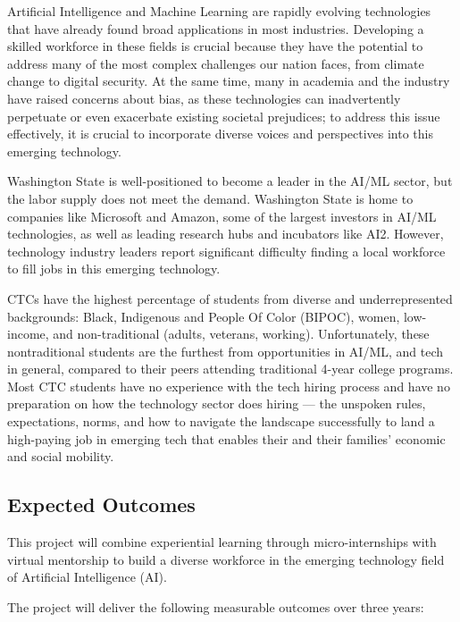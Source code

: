 Artificial Intelligence and Machine Learning are rapidly evolving technologies that have already found broad applications in most industries. Developing a skilled workforce in these fields is crucial because they have the potential to address many of the most complex challenges our nation faces, from climate change to digital security. At the same time, many in academia and the industry have raised concerns about bias, as these technologies can inadvertently perpetuate or even exacerbate existing societal prejudices; to address this issue effectively, it is crucial to incorporate diverse voices and perspectives into this emerging technology.

Washington State is well-positioned to become a leader in the AI/ML sector, but the labor supply does not meet the demand. Washington State is home to companies like Microsoft and Amazon, some of the largest investors in AI/ML technologies, as well as leading research hubs and incubators like AI2. However, technology industry leaders report significant difficulty finding a local workforce to fill jobs in this emerging technology. \cite{soper_is_2023}

CTCs have the highest percentage of students from diverse and underrepresented  backgrounds: Black, Indigenous and People Of Color (BIPOC), women, low-income, and non-traditional (adults, veterans, working).\cite{AlmanacAmericanEducation,phillippeNationalProfileCommunity2005} Unfortunately, these nontraditional students are the furthest from opportunities in AI/ML, and tech in general,\cite{singerLowerIncomeStudentsBig2023,saldanhaBlackWorkersWomen2023} compared to their peers attending traditional 4-year college programs.\cite{lohrEngineUpwardMobility2022} Most CTC students have no experience with the tech hiring process and have no preparation on how the technology sector does hiring --- the unspoken rules, expectations, norms, and how to navigate the landscape successfully to land a high-paying job in emerging tech that enables their and their families’ economic and social mobility.

\subsection{Expected Outcomes}

This project will combine experiential learning through micro-internships with virtual mentorship to build a diverse workforce in the emerging technology field of Artificial Intelligence (AI). 

The project will deliver the following measurable outcomes over three years:

